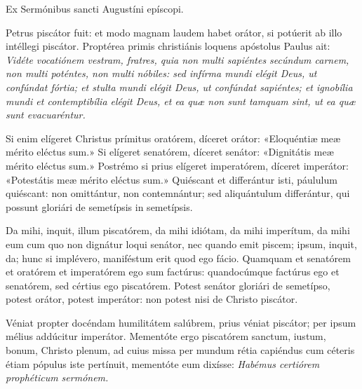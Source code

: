 {\noindent Ex Sermónibus sancti Augustíni epíscopi.

\noindent Petrus piscátor fuit: et modo magnam laudem habet orátor, si potúerit ab illo intéllegi piscátor. Proptérea primis christiánis loquens apóstolus Paulus ait: \emph{Vidéte vocatiónem vestram, fratres, quia non multi sapiéntes secúndum carnem, non multi poténtes, non multi nóbiles: sed infírma mundi elégit Deus, ut confúndat fórtia; et stulta mundi elégit Deus, ut confúndat sapiéntes; et ignobília mundi et contemptibília elégit Deus, et ea quæ non sunt tamquam sint, ut ea quæ sunt evacuaréntur.}

\noindent Si enim elígeret Christus prímitus oratórem, díceret orátor: «Eloquéntiæ meæ mérito eléctus sum.» Si elígeret senatórem, díceret senátor: «Dignitátis meæ mérito eléctus sum.» Postrémo si prius elígeret imperatórem, díceret imperátor: «Potestátis meæ mérito eléctus sum.» Quiéscant et differántur isti, páululum quiéscant: non omittántur, non contemnántur; sed aliquántulum differántur, qui possunt gloriári de semetípsis in semetípsis.

\noindent Da mihi, inquit, illum piscatórem, da mihi idiótam, da mihi imperítum, da mihi eum cum quo non dignátur loqui senátor, nec quando emit piscem; ipsum, inquit, da; hunc si implévero, maniféstum erit quod ego fácio. Quamquam et senatórem et oratórem et imperatórem ego sum factúrus: quandocúmque factúrus ego et senatórem, sed cértius ego piscatórem. Potest senátor gloriári de semetípso, potest orátor, potest imperátor: non potest nisi de Christo piscátor.

\noindent Véniat propter docéndam humilitátem salúbrem, prius véniat piscátor; per ipsum mélius addúcitur imperátor. Mementóte ergo piscatórem sanctum, iustum, bonum, Christo plenum, ad cuius missa per mundum rétia capiéndus cum céteris étiam pópulus iste pertínuit, mementóte eum dixísse: \emph{Habémus certiórem prophéticum sermónem.}

\vfill
\pagebreak

 

\vspace{-5mm}


\vfill
\pagebreak
}
\newcommand{\responsoriumbreve}{\pars{Responsorium breve.}

\cuminitiali{VI}{temporalia/resp-christefilidei.gtex}}
